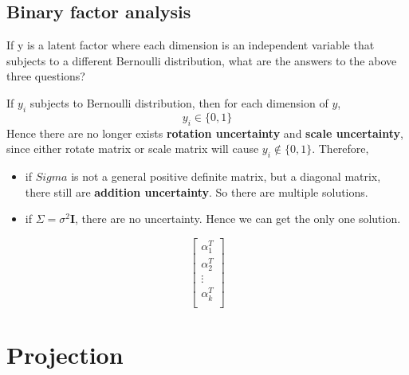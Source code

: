 \documentclass{article}
\newenvironment{answer}{\par\color{ForestGreen}}{\par}
\newcommand{\I}{\mathbf{I}}
\begin{document}
\subsection{Binary factor analysis}
If y is a latent factor where each dimension is an independent variable that subjects to a
different Bernoulli distribution, what are the answers to the above three questions?
\begin{answer}
  If $y_i$ subjects to Bernoulli distribution, then for each dimension of $y$,
  $$y_i \in \{0, 1\}$$
  Hence there are no longer exists \textbf{rotation uncertainty} and \textbf{scale uncertainty}, since either rotate matrix or scale matrix will cause $y_i\notin \{0, 1\}$.
  Therefore,
  \begin{itemize}
      \item if $Sigma$ is not a general positive definite matrix, but a diagonal matrix, there still are \textbf{addition uncertainty}. So there are multiple solutions.
      \item if $\Sigma = \sigma^2\I$, there are no uncertainty. Hence we can get the only one solution.
  \end{itemize}

  $$\begin{bmatrix}
                     \alpha_1^T \\
                     \alpha_2^T \\
                     \vdots \\
                     \alpha_k^T \\
                 \end{bmatrix}$$
\end{answer}

\section{Projection}
\end{document}
